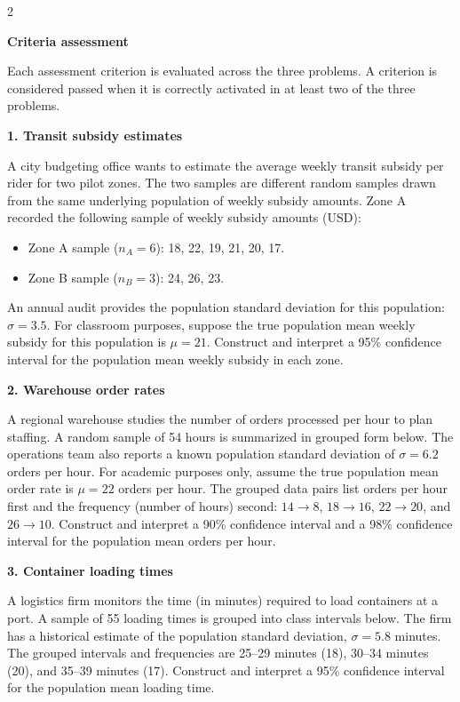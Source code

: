 \documentclass[12pt]{article}
\newcommand{\SubsectionBox}[1]{%
	\noindent\colorbox{gray!30}{%
		\parbox{\linewidth}{\textbf{#1}}%
	}\par\vspace{0.35cm}%
}
\begin{document}
	\begin{multicols}{2}
		\SubsectionBox{Criteria assessment}\vspace{-0.25cm}
		Each assessment criterion is evaluated across the three problems. A criterion is considered passed when it is correctly activated in at least two of the three problems.
		
		\vspace{0.25cm}
		\SubsectionBox{1. Transit subsidy estimates}\vspace{-0.25cm}
		A city budgeting office wants to estimate the average weekly transit subsidy per rider for two pilot zones.
		The two samples are different random samples drawn from the same underlying population of weekly subsidy amounts.
		Zone A recorded the following sample of weekly subsidy amounts (USD):

		\begin{itemize}
			\item Zone A sample (\(n_A = 6\)): 18, 22, 19, 21, 20, 17.
			\item Zone B sample (\(n_B = 3\)): 24, 26, 23.
		\end{itemize}

		An annual audit provides the population standard deviation for this population: \(\sigma = 3.5\).
		For classroom purposes, suppose the true population mean weekly subsidy for this population is \(\mu = 21\).
		Construct and interpret a 95\% confidence interval for the population mean weekly subsidy in each zone.

		\vspace{0.25cm}
		\SubsectionBox{2. Warehouse order rates}\vspace{-0.25cm}
		A regional warehouse studies the number of orders processed per hour to plan staffing.
		A random sample of 54 hours is summarized in grouped form below. The operations team also reports a known population standard deviation of \(\sigma = 6.2\) orders per hour.
		For academic purposes only, assume the true population mean order rate is \(\mu = 22\) orders per hour.
		The grouped data pairs list orders per hour first and the frequency (number of hours) second: \(14 \rightarrow 8\), \(18 \rightarrow 16\), \(22 \rightarrow 20\), and \(26 \rightarrow 10\).
		Construct and interpret a 90\% confidence interval and a 98\% confidence interval for the population mean orders per hour.

		\vspace{0.25cm}
		\SubsectionBox{3. Container loading times}\vspace{-0.25cm}
		A logistics firm monitors the time (in minutes) required to load containers at a port.
		A sample of 55 loading times is grouped into class intervals below. The firm has a historical estimate of the population standard deviation, \(\sigma = 5.8\) minutes.
		The grouped intervals and frequencies are 25--29 minutes (18), 30--34 minutes (20), and 35--39 minutes (17).
		Construct and interpret a 95\% confidence interval for the population mean loading time.

	\end{multicols}
\end{document}
